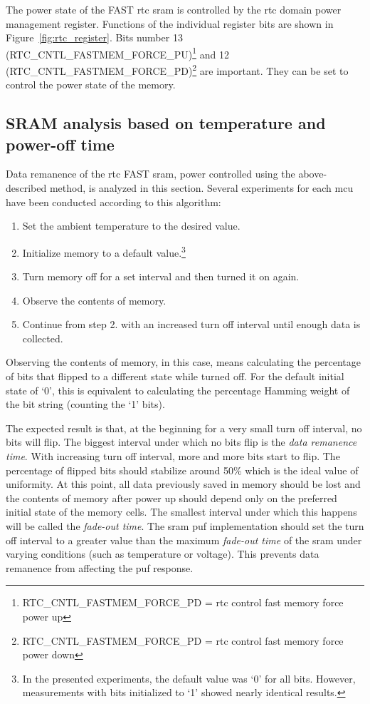 The power state of the FAST \gls{rtc} \gls{sram} is controlled by the \gls{rtc} domain power management register. Functions of the individual register bits are shown in Figure~\ref{fig:rtc_register}. Bits number 13 (RTC\_CNTL\_FASTMEM\_FORCE\_PU)\footnote{RTC\_CNTL\_FASTMEM\_FORCE\_PD = \gls{rtc} control fast memory force power up} and 12 (RTC\_CNTL\_FASTMEM\_FORCE\_PD)\footnote{RTC\_CNTL\_FASTMEM\_FORCE\_PD = \gls{rtc} control fast memory force power down} are important. They can be set to control the power state of the memory.\cite{esp322021}

\subsection{SRAM analysis based on temperature and power-off time}\label{sec:rtc_analysis}

Data remanence of the \gls{rtc} FAST \gls{sram}, power controlled using the above-described method, is analyzed in this section. Several experiments for each \gls{mcu} have been conducted according to this algorithm:

\begin{enumerate}
    \item Set the ambient temperature to the desired value.
    \item Initialize memory to a default value.\footnote{In the presented experiments, the default value was `0' for all bits. However, measurements with bits initialized to `1' showed nearly identical results.}
    \item Turn memory off for a set interval and then turned it on again.
    \item Observe the contents of memory.
    \item Continue from step 2. with an increased turn off interval until enough data is collected.
\end{enumerate}

Observing the contents of memory, in this case, means calculating the percentage of bits that flipped to a different state while turned off. For the default initial state of `0', this is equivalent to calculating the percentage Hamming weight of the bit string (counting the `1' bits).

The expected result is that, at the beginning for a very small turn off interval, no bits will flip. The biggest interval under which no bits flip is the \emph{data remanence time}. With increasing turn off interval, more and more bits start to flip. The percentage of flipped bits should stabilize around 50\% which is the ideal value of uniformity. At this point, all data previously saved in memory should be lost and the contents of memory after power up should depend only on the preferred initial state of the memory cells. The smallest interval under which this happens will be called the \emph{fade-out time}. The \gls{sram} \gls{puf} implementation should set the turn off interval to a greater value than the maximum \emph{fade-out time} of the \gls{sram} under varying conditions (such as temperature or voltage). This prevents data remanence from affecting the \gls{puf} response.

